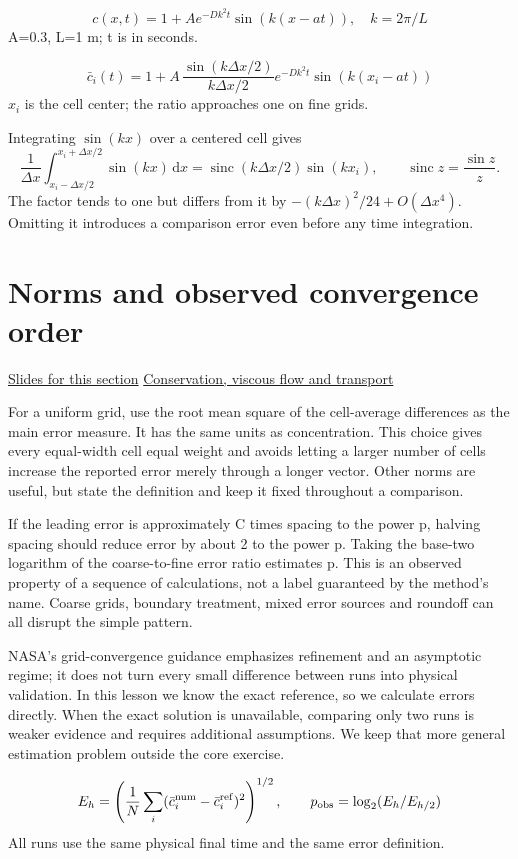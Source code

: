 \documentclass[11pt,letterpaper]{article}
\theoremstyle{definition}\newtheorem{definition}{Definition}\newtheorem{example}{Example}
\numberwithin{equation}{section}
\begin{document}
\[
c(x,t)=1+A e^{-Dk^2t}\sin(k(x-at)),\quad k=2\pi/L
\]
A=0.3, L=1 m; t is in seconds.

\[
\bar c_i(t)=1+A\,\frac{\sin(k\Delta x/2)}{k\Delta x/2}e^{-Dk^2t}\sin(k(x_i-at))
\]
$x_i$ is the cell center; the ratio approaches one on fine grids.

Integrating $\sin(kx)$ over a centered cell gives
\[
 \frac1{\Delta x}\int_{x_i-\Delta x/2}^{x_i+\Delta x/2}\sin(kx)\,\mathrm dx
 =\operatorname{sinc}(k\Delta x/2)\sin(kx_i),
 \qquad\operatorname{sinc}z=\frac{\sin z}{z}.
\]
The factor tends to one but differs from it by $-(k\Delta x)^2/24+O(\Delta x^4)$. Omitting it introduces a comparison error even before any time integration.
\section{Norms and observed convergence order}
\hypertarget{note-norms-and-observed-convergence-order}{}\label{note:norms-and-observed-convergence-order}
{\small \href{slides.html\#frame=an-rms-error\&step=1}{Slides for this section} \quad \href{../modules/cfd/index.html}{Conservation, viscous flow and transport}}\par
For a uniform grid, use the root mean square of the cell-average differences as the main error measure. It has the same units as concentration. This choice gives every equal-width cell equal weight and avoids letting a larger number of cells increase the reported error merely through a longer vector. Other norms are useful, but state the definition and keep it fixed throughout a comparison.

If the leading error is approximately C times spacing to the power p, halving spacing should reduce error by about 2 to the power p. Taking the base-two logarithm of the coarse-to-fine error ratio estimates p. This is an observed property of a sequence of calculations, not a label guaranteed by the method's name. Coarse grids, boundary treatment, mixed error sources and roundoff can all disrupt the simple pattern.

NASA's grid-convergence guidance emphasizes refinement and an asymptotic regime; it does not turn every small difference between runs into physical validation. In this lesson we know the exact reference, so we calculate errors directly. When the exact solution is unavailable, comparing only two runs is weaker evidence and requires additional assumptions. We keep that more general estimation problem outside the core exercise.

\[
E_h=\left(\frac1N\sum_i(\bar c_i^{\rm num}-\bar c_i^{\rm ref})^2\right)^{1/2},\qquad p_{\rm obs}=\log_2(E_h/E_{h/2})
\]
All runs use the same physical final time and the same error definition.
\end{document}
